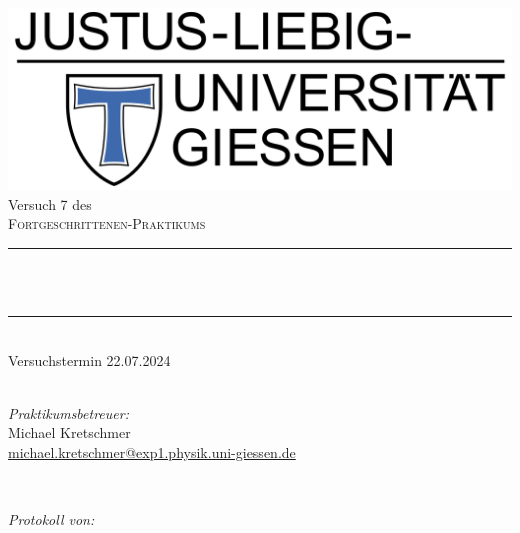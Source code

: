 \documentclass[12pt,a4paper,ngerman]{report}
\title{\mytitle} %
\author{Frederik Uhlemann, Florian Adamczyk}
\date{\today}
\makeatletter
\let\thetitle\@title
\makeatother
\begin{document}
		
	
	\begin{titlepage}
		\centering
		\vspace*{0.5 cm}
		\includegraphics[width = 0.6 \textwidth]{JLU_Giessen-Logo}	%
		\\[2.0 cm]
		Versuch 7 des\\
		\textsc{\Large Fortgeschrittenen-Praktikums}\\ [0.3 cm]				%
		\rule{\linewidth}{0.2 mm} \\[0.4 cm]
		{ \huge \bfseries \thetitle}\\
		\rule{\linewidth}{0.2 mm}\\
		Versuchstermin 22.07.2024 \\
		~ \\
		[2.0 cm]
		
		
		\begin{minipage}{0.49\textwidth}
			\begin{flushleft}
				 \emph{Praktikumsbetreuer:}\\
				 Michael Kretschmer\\
				 \small{\href{mailto:michael.kretschmer@exp1.physik.uni-giessen.de}{michael.kretschmer@exp1.physik.uni-giessen.de}}
			\end{flushleft}
		\end{minipage}~
		\begin{minipage}{0.49\textwidth}
			\begin{flushright}
				\emph{Protokoll von:} \\
				

\end{flushright}
\end{minipage}
\end{titlepage}
\end{document}
